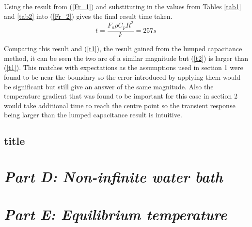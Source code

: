 \documentclass[11pt]{article}
\begin{document}
Using the result from (\ref{Fr_1}) and substituting in the values from Tables \ref{tab1} and \ref{tab2} into (\ref{Fr_2}) gives the final result time taken.
\boldmath
\begin{equation}\label{t2}
	t = \frac{F_{o}\rho C_{p} R^{2}}{k} = 257 s
\end{equation}
\unboldmath

Comparing this result and (\ref{t1}), the result gained from the lumped capacitance method, it can be seen the two are of a similar magnitude but (\ref{t2}) is larger than (\ref{t1}). This matches with expectations as the assumptions used in section 1 were found to be near the boundary so the error introduced by applying them would be significant but still give an answer of the same magnitude. Also the temperature gradient that was found to be important for this case in section 2 would take additional time to reach the centre point so the transient response being larger than the lumped capacitance result is intuitive.

\subsection{title}

\section{\emph{Part D: Non-infinite water bath}}

\section{\emph{Part E: Equilibrium temperature}}



\end{document}
